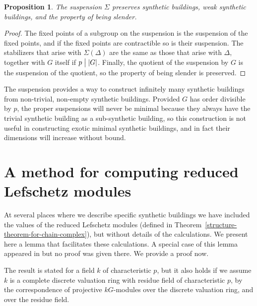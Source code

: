 \documentclass[12pt]{amsart}
\theoremstyle{plain}
\newtheorem{proposition}[theorem]{Proposition}
\theoremstyle{definition}
\theoremstyle{remark}
\numberwithin{equation}{section}
\begin{document}
\begin{proposition}
    The suspension $\Sigma$ preserves synthetic buildings, weak synthetic buildings, and the property of being slender.
\end{proposition}

\begin{proof}
    The fixed points of a subgroup on the suspension is the suspension of the fixed points, and if the fixed points are contractible so is their suspension. The stabilizers that arise with $\Sigma(\Delta)$ are the same as those that arise with $\Delta$, together with $G$ itself if $p\bigm| |G|$. Finally, the quotient of the suspension by $G$ is the suspension of the quotient, so the property of being slender is preserved.
\end{proof}

 The suspension provides a way to construct infinitely many synthetic buildings from non-trivial, non-empty synthetic buildings. Provided $G$ has order divisible by $p$, the proper suspensions will never be minimal because they always have the trivial synthetic building as a sub-synthetic building, so this construction is not useful in constructing exotic minimal synthetic buildings, and in fact their dimensions will increase without bound.

\section{A method for computing reduced Lefschetz modules}
\label{Lefschetz-module-section}
    
At several places where we describe specific synthetic buildings we have included the values of the reduced Lefschetz modules (defined in Theorem~\ref{structure-theorem-for-chain-complex}), but without details of the calculations. We present here a lemma that facilitates these calculations. A special case of this lemma appeared in \cite[Propn. 5.3]{Web1987-2} but no proof was given there. We provide a proof now.

The result is stated for a field $k$ of characteristic $p$, but it also holds if we assume $k$ is a complete discrete valuation ring with residue field of characteristic $p$, by the correspondence of projective $kG$-modules over the discrete valuation ring, and over the residue field.
\end{document}

